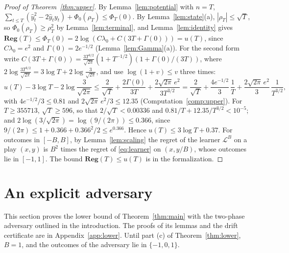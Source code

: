 \documentclass[12pt]{amsart}
\theoremstyle{definition}
\numberwithin{equation}{section}
\newcommand{\Reg}{\mathbf{Reg}}
\newcommand{\yh}{\hat y}
\begin{document}
\begin{proof}[Proof of Theorem~\ref{thm:upper}]
By Lemma~\ref{lem:potential} with $n=T$, $\sum_{t\le T}(\yh_t^2-2\yh_ty_t)+\Phi_0(\rho_T)\le\Phi_T(0)$. By Lemma~\ref{lem:state}(a), $|\rho_T|\le\sqrt T$, so $\Phi_0(\rho_T)\ge\rho_T^2$ by Lemma~\ref{lem:terminal}, and Lemma~\ref{lem:identity} gives $\Reg(T)\le\Phi_T(0)=2\log(C\lambda_0+C(3T+\Gamma(0)))=u(T)$, since $C\lambda_0=e^2$ and $\Gamma(0)=2e^{-1/2}$ (Lemma~\ref{lem:Gamma}(a)). For the second form write $C(3T+\Gamma(0))=\frac{3T^{3/2}}{\sqrt{2\pi}}(1+T^{-1/2})(1+\Gamma(0)/(3T))$, where $2\log\frac{3T^{3/2}}{\sqrt{2\pi}}=3\log T+2\log\frac3{\sqrt{2\pi}}$, and use $\log(1+v)\le v$ three times:
\[
u(T)-3\log T-2\log\frac3{\sqrt{2\pi}}\le\frac2{\sqrt T}+\frac{2\Gamma(0)}{3T}+\frac{2\sqrt{2\pi}\,e^2}{3T^{3/2}}=\frac2{\sqrt T}+\frac{4e^{-1/2}}{3}\,\frac1T+\frac{2\sqrt{2\pi}\,e^2}{3}\,\frac1{T^{3/2}},
\]
with $4e^{-1/2}/3\le0.81$ and $2\sqrt{2\pi}\,e^2/3\le12.35$ (Computation~\ref{comp:upper}). For $T\ge355713$, $\sqrt T\ge596$, so that $2/\sqrt T<0.00336$ and $0.81/T+12.35/T^{3/2}<10^{-5}$; and $2\log(3/\sqrt{2\pi})=\log(9/(2\pi))\le0.366$, since $9/(2\pi)\le1+0.366+0.366^2/2\le e^{0.366}$. Hence $u(T)\le3\log T+0.37$. For outcomes in $[-B,B]$, by Lemma~\ref{lem:scaling} the regret of the learner $\mathcal L^B$ on a play $(x,y)$ is $B^2$ times the regret of \eqref{eq:learner} on $(x,y/B)$, whose outcomes lie in $[-1,1]$. The bound $\Reg(T)\le u(T)$ is  in the formalization.
\end{proof}

\section{An explicit adversary}\label{sec:lower}

This section proves the lower bound of Theorem~\ref{thm:main} with the two-phase adversary outlined in the introduction. The proofs of its lemmas and the drift certificate are in Appendix~\ref{app:lower}. Until part (c) of Theorem~\ref{thm:lower}, $B=1$, and the outcomes of the adversary lie in $\{-1,0,1\}$.
\end{document}
